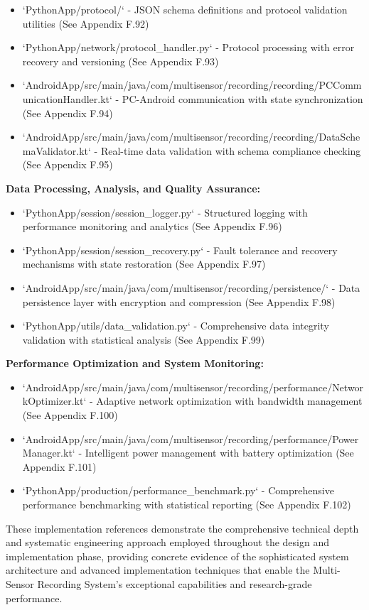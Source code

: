 \documentclass[12pt,a4paper]{article}
\begin{document}
\begin{itemize}
\item `PythonApp/protocol/` - JSON schema definitions and protocol validation utilities (See Appendix F.92)
\item `PythonApp/network/protocol_handler.py` - Protocol processing with error recovery and versioning (See Appendix
  F.93)
\item `AndroidApp/src/main/java/com/multisensor/recording/recording/PCCommunicationHandler.kt` - PC-Android communication
  with state synchronization (See Appendix F.94)
\item `AndroidApp/src/main/java/com/multisensor/recording/recording/DataSchemaValidator.kt` - Real-time data validation with
  schema compliance checking (See Appendix F.95)

\end{itemize}
\textbf{Data Processing, Analysis, and Quality Assurance:}

\begin{itemize}
\item `PythonApp/session/session_logger.py` - Structured logging with performance monitoring and analytics (See Appendix
  F.96)
\item `PythonApp/session/session_recovery.py` - Fault tolerance and recovery mechanisms with state restoration (See
  Appendix F.97)
\item `AndroidApp/src/main/java/com/multisensor/recording/persistence/` - Data persistence layer with encryption and
  compression (See Appendix F.98)
\item `PythonApp/utils/data_validation.py` - Comprehensive data integrity validation with statistical analysis (See
  Appendix F.99)

\end{itemize}
\textbf{Performance Optimization and System Monitoring:}

\begin{itemize}
\item `AndroidApp/src/main/java/com/multisensor/recording/performance/NetworkOptimizer.kt` - Adaptive network optimization
  with bandwidth management (See Appendix F.100)
\item `AndroidApp/src/main/java/com/multisensor/recording/performance/PowerManager.kt` - Intelligent power management with
  battery optimization (See Appendix F.101)
\item `PythonApp/production/performance_benchmark.py` - Comprehensive performance benchmarking with statistical
  reporting (See Appendix F.102)

\end{itemize}
These implementation references demonstrate the comprehensive technical depth and systematic engineering approach
employed throughout the design and implementation phase, providing concrete evidence of the sophisticated system
architecture and advanced implementation techniques that enable the Multi-Sensor Recording System's exceptional
capabilities and research-grade performance.
\end{document}
